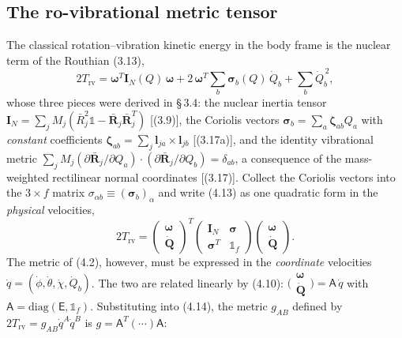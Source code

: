 \subsection{The ro-vibrational metric tensor}

The classical rotation--vibration kinetic energy in the body frame is the nuclear term of the Routhian (3.13),
\begin{equation}
2T_{\mathrm{rv}}
=\boldsymbol\omega^{T}\mathbf I_N(Q)\,\boldsymbol\omega
+2\,\boldsymbol\omega^{T}\!\sum_b\boldsymbol\sigma_b(Q)\,\dot Q_b
+\sum_b\dot Q_b^{\,2}, \tag{4.13}
\end{equation}
whose three pieces were derived in \S\,3.4: the nuclear inertia tensor $\mathbf I_N=\sum_jM_j(\bar R_j^2\mathbb 1-\bar{\mathbf R}_j\bar{\mathbf R}_j^{T})$ [(3.9)], the Coriolis vectors $\boldsymbol\sigma_b=\sum_a\boldsymbol\zeta_{ab}Q_a$ with \emph{constant} coefficients $\boldsymbol\zeta_{ab}=\sum_j\mathbf l_{ja}\times\mathbf l_{jb}$ [(3.17a)], and the identity vibrational metric $\sum_jM_j(\partial\bar{\mathbf R}_j/\partial Q_a)\!\cdot\!(\partial\bar{\mathbf R}_j/\partial Q_b)=\delta_{ab}$, a consequence of the mass-weighted rectilinear normal coordinates [(3.17)]. Collect the Coriolis vectors into the $3\times f$ matrix $\sigma_{\alpha b}\equiv(\boldsymbol\sigma_b)_\alpha$ and write (4.13) as one quadratic form in the \emph{physical} velocities,
\begin{equation}
2T_{\mathrm{rv}}=\begin{pmatrix}\boldsymbol\omega\\ \dot{\mathbf Q}\end{pmatrix}^{\!T}
\begin{pmatrix}\mathbf I_N & \boldsymbol\sigma\\ \boldsymbol\sigma^{T} & \mathbb 1_f\end{pmatrix}
\begin{pmatrix}\boldsymbol\omega\\ \dot{\mathbf Q}\end{pmatrix}. \tag{4.14}
\end{equation}
The metric of (4.2), however, must be expressed in the \emph{coordinate} velocities $\dot q=(\dot\phi,\dot\theta,\dot\chi,\dot Q_b)$. The two are related linearly by (4.10): $\bigl(\begin{smallmatrix}\boldsymbol\omega\\ \dot{\mathbf Q}\end{smallmatrix}\bigr)=\mathsf A\,\dot q$ with $\mathsf A=\mathrm{diag}(\mathsf E,\mathbb 1_f)$. Substituting into (4.14), the metric $g_{AB}$ defined by $2T_{\mathrm{rv}}=g_{AB}\dot q^A\dot q^B$ is $g=\mathsf A^{T}(\cdots)\mathsf A$:
